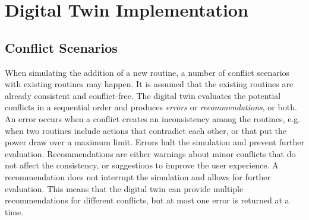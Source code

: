 \chapter{Digital Twin Implementation}\label{ch:implementation}

\section{Conflict Scenarios}

When simulating the addition of a new routine, a number of conflict scenarios with existing routines may happen. It is assumed that the existing routines are already consistent and conflict-free. The digital twin evaluates the potential conflicts in a sequential order and produces \textit{errors} or \textit{recommendations}, or both. An error occurs when a conflict creates an inconsistency among the routines, e.g. when two routines include actions that contradict each other, or that put the power draw over a maximum limit. Errors halt the simulation and prevent further evaluation. Recommendations are either warnings about minor conflicts that do not affect the consistency, or suggestions to improve the user experience. A recommendation does not interrupt the simulation and allows for further evaluation. This means that the digital twin can provide multiple recommendations for different conflicts, but at most one error is returned at a time.

